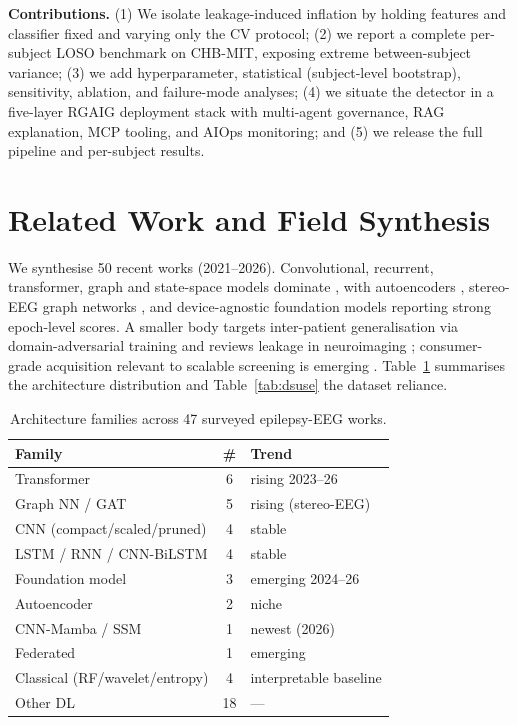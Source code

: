 \documentclass[10pt,journal,twocolumn]{IEEEtran}
\begin{document}
\textbf{Contributions.} (1) We isolate leakage-induced inflation by holding features and classifier fixed and varying only the CV protocol; (2) we report a complete per-subject LOSO benchmark on CHB-MIT, exposing extreme between-subject variance; (3) we add hyperparameter, statistical (subject-level bootstrap), sensitivity, ablation, and failure-mode analyses; (4) we situate the detector in a five-layer RGAIG deployment stack with multi-agent governance, RAG explanation, MCP tooling, and AIOps monitoring; and (5) we release the full pipeline and per-subject results.

\section{Related Work and Field Synthesis}
We synthesise 50 recent works (2021--2026). Convolutional, recurrent, transformer, graph and state-space models dominate \citep{ep241003385,ep230103470,ep251108861,ep260113234}, with autoencoders \citep{ep250820535}, stereo-EEG graph networks \citep{ep250215198}, and device-agnostic foundation models \citep{ep251108861} reporting strong epoch-level scores. A smaller body targets inter-patient generalisation via domain-adversarial training \citep{ep250515203} and reviews leakage in neuroimaging \citep{ep210203336}; consumer-grade acquisition relevant to scalable screening is emerging \citep{ep251101879,ep220706914}. Table~\ref{tab:arch} summarises the architecture distribution and Table~\ref{tab:dsuse} the dataset reliance.

\begin{table}[h]\centering\caption{Architecture families across 47 surveyed epilepsy-EEG works.}\label{tab:arch}
\begin{tabular}{lcl}\toprule
Family & \# & Trend\\\midrule
Transformer & 6 & rising 2023--26\\
Graph NN / GAT & 5 & rising (stereo-EEG)\\
CNN (compact/scaled/pruned) & 4 & stable\\
LSTM / RNN / CNN-BiLSTM & 4 & stable\\
Foundation model & 3 & emerging 2024--26\\
Autoencoder & 2 & niche\\
CNN-Mamba / SSM & 1 & newest (2026)\\
Federated & 1 & emerging\\
Classical (RF/wavelet/entropy) & 4 & interpretable baseline\\
Other DL & 18 & ---\\\bottomrule
\end{tabular}\end{table}
\end{document}
